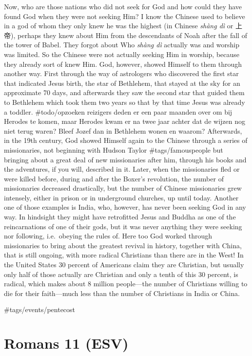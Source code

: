 Now, who are those nations who did not seek for God and how could they
have found God when they were not seeking Him? I know the Chinese used
to believe in a god of whom they only knew he was the highest (in
Chinese \emph{shàng dì} or 上帝), perhaps they knew about Him from the
descendants of Noah after the fall of the tower of Babel. They forgot
about Who \emph{shàng dì} actually was and worship was limited. So the
Chinese were not actually seeking Him in worship, because they already
sort of knew Him. God, however, showed Himself to them through another
way. First through the way of astrologers who discovered the first star
that indicated Jesus birth, the star of Bethlehem, that stayed at the
sky for an approximate 70 days, and afterwards they saw the second star
that guided them to Bethlehem which took them two years so that by that
time Jesus was already a toddler. \#todo/opzoeken reizigers deden er een
paar maanden over om bij Herodes te komen, maar Herodes kwam er na twee
jaar achter dat de wijzen nog niet terug waren? Bleef Jozef dan in
Bethlehem wonen en waarom? Afterwards, in the 19th century, God showed
Himself again to the Chinese through a series of missionaries, not
beginning with Hudson Taylor \#tags/famouspeople but bringing about a
great deal of new missionaries after him, through his books and the
adventures, if you will, described in it. Later, when the missionaries
fled or were killed before, during and after the Boxer's revolution, the
number of missionaries decreased drastically, but the number of Chinese
missionaries grew intensely, either in prison or in underground
churches, up until today. Another one of those examples is India, who,
however, has never been seeking God in any way. In hindsight they might
have retrofitted Jesus and Buddha as one of the reincarnations of one of
their gods, but it was never anything they were seeking nor following,
i.e.~obeying the rules of. Here too God worked through missionaries to
bring about the greatest revival in history, together with China, that
is still ongoing, with more radical Christians than there are in the
West! In the United States 30 percent of Americans claim they are
Christian, but usually only half of those actually are Christian and
only a tenth of this 30 percent, is radical, which makes about 8 million
people---the number of Christians willing to die for their faith---much
less than the number of Christians in India or China.

 \#tags/events/pentecost

\hypertarget{romans-11-esv}{%
\section{Romans 11 (ESV)}\label{romans-11-esv}}
\vspace{10.5cm}
